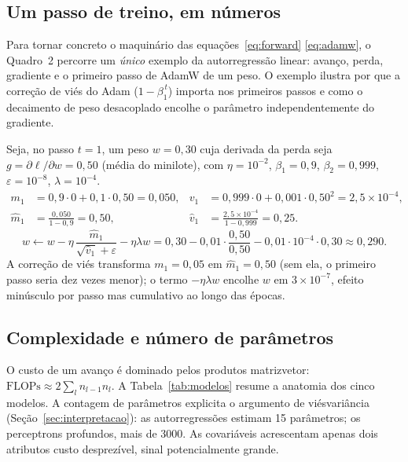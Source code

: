 \documentclass[12pt,a4paper,oneside]{article}
\begin{document}
\subsection{Um passo de treino, em números}

Para tornar concreto o maquinário das equações~\eqref{eq:forward}\textendash
\eqref{eq:adamw}, o Quadro~2 percorre um \emph{único}
exemplo da autorregressão linear: avanço, perda, gradiente e o primeiro
passo de AdamW de um peso. O exemplo ilustra por que a correção de viés do
Adam ($1-\beta_1^{\,t}$) importa nos primeiros passos e como o decaimento de
peso desacoplado encolhe o parâmetro independentemente do gradiente.

\begin{tcolorbox}[colback=black!2,colframe=black!35,boxrule=0.5pt,
  left=8pt,right=8pt,top=6pt,bottom=6pt,
  title=\textbf{Quadro 2 \textendash{} Um passo de AdamW para um peso (ilustrativo)}]
\small{}
Seja, no passo $t=1$, um peso $w=0{,}30$ cuja derivada da perda seja
$g=\partial\ell/\partial w=0{,}50$ (média do minilote), com
$\eta=10^{-2}$, $\beta_1=0{,}9$, $\beta_2=0{,}999$, $\varepsilon=10^{-8}$,
$\lambda=10^{-4}$.
\begin{align*}
m_1 &= 0{,}9\cdot 0 + 0{,}1\cdot 0{,}50 = 0{,}050, &
v_1 &= 0{,}999\cdot 0 + 0{,}001\cdot 0{,}50^2 = 2{,}5\times 10^{-4},\\
\widehat{m}_1 &= \tfrac{0{,}050}{1-0{,}9} = 0{,}50, &
\widehat{v}_1 &= \tfrac{2{,}5\times 10^{-4}}{1-0{,}999} = 0{,}25.
\end{align*}
\[
w \leftarrow w - \eta\,\frac{\widehat{m}_1}{\sqrt{\widehat{v}_1}+\varepsilon}
 - \eta\lambda w
 = 0{,}30 - 0{,}01\cdot\frac{0{,}50}{0{,}50} - 0{,}01\cdot 10^{-4}\cdot 0{,}30 \approx 0{,}290.
\]
A correção de viés transforma $m_1=0{,}05$ em $\widehat{m}_1=0{,}50$ (sem
ela, o primeiro passo seria dez vezes menor); o termo $-\eta\lambda w$
encolhe $w$ em $3\times 10^{-7}$, efeito minúsculo por passo mas cumulativo
ao longo das épocas.
\end{tcolorbox}

\subsection{Complexidade e número de parâmetros}

O custo de um avanço é dominado pelos produtos matriz\-vetor:
$\mathrm{FLOPs}\approx 2\sum_l n_{l-1}n_l$. A Tabela~\ref{tab:modelos}
resume a anatomia dos cinco modelos. A contagem de parâmetros explicita o
argumento de viés\-variância (Seção~\ref{sec:interpretacao}): as
autorregressões estimam 15 parâmetros; os perceptrons
profundos, mais de \num{3000}. As covariáveis acrescentam apenas dois
atributos \textemdash{} custo desprezível, sinal potencialmente grande.
\end{document}
